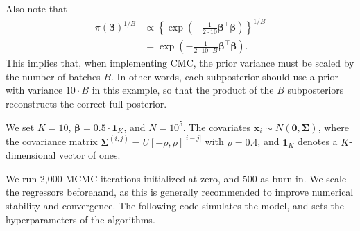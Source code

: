 Also note that 
\begin{align*}
	\pi(\boldsymbol{\beta})^{1/B} &\propto \left\{\exp\left(-\frac{1}{2 \cdot 10} \boldsymbol{\beta}^\top \boldsymbol{\beta}\right)\right\}^{1/B} \\
	&= \exp\left(-\frac{1}{2 \cdot 10 \cdot B} \boldsymbol{\beta}^\top \boldsymbol{\beta} \right).
\end{align*}
This implies that, when implementing CMC, the prior variance must be scaled by the number of batches \( B \). In other words, each subposterior should use a prior with variance \( 10 \cdot B \) in this example, so that the product of the \( B \) subposteriors reconstructs the correct full posterior.

We set \( K = 10 \), \( \boldsymbol{\beta} = 0.5 \cdot \mathbf{1}_K \), and \( N = 10^5 \). The covariates \( \mathbf{x}_i \sim {N}(\mathbf{0}, \boldsymbol{\Sigma}) \), where the covariance matrix \( \boldsymbol{\Sigma}^{(i,j)} = U[-\rho, \rho]^{|i-j|} \) with \( \rho = 0.4 \), and \( \mathbf{1}_K \) denotes a \( K \)-dimensional vector of ones.

We run 2{,}000 MCMC iterations initialized at zero, and 500 as burn-in. We scale the regressors beforehand, as this is generally recommended to improve numerical stability and convergence. The following code simulates the model, and sets the hyperparameters of the algorithms.

